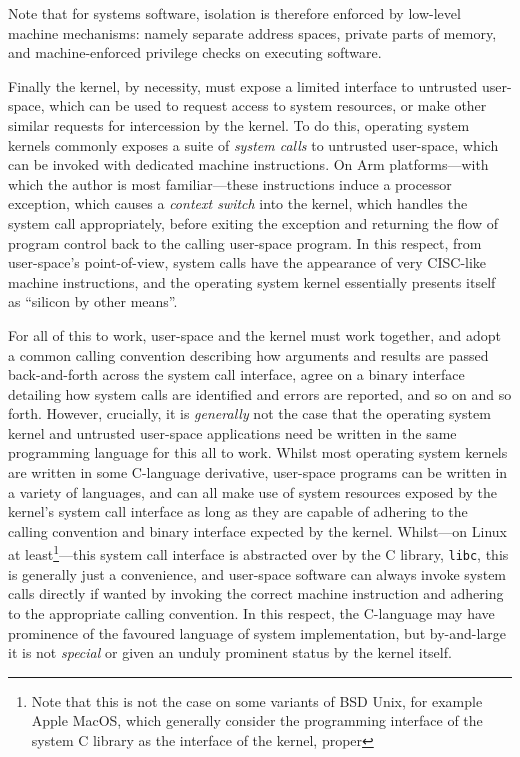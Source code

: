 \documentclass[a4paper, UKenglish, cleveref, autoref, thm-restate]{lipics-v2021}
\begin{document}
Note that for systems software, isolation is therefore enforced by low-level machine mechanisms: namely separate address spaces, private parts of memory, and machine-enforced privilege checks on executing software.

Finally the kernel, by necessity, must expose a limited interface to untrusted user-space, which can be used to request access to system resources, or make other similar requests for intercession by the kernel.
To do this, operating system kernels commonly exposes a suite of \emph{system calls} to untrusted user-space, which can be invoked with dedicated machine instructions.
On Arm platforms---with which the author is most familiar---these instructions induce a processor exception, which causes a \emph{context switch} into the kernel, which handles the system call appropriately, before exiting the exception and returning the flow of program control back to the calling user-space program.
In this respect, from user-space's point-of-view, system calls have the appearance of very CISC-like machine instructions, and the operating system kernel essentially presents itself as ``silicon by other means''.

For all of this to work, user-space and the kernel must work together, and adopt a common calling convention describing how arguments and results are passed back-and-forth across the system call interface, agree on a binary interface detailing how system calls are identified and errors are reported, and so on and so forth.
However, crucially, it is \emph{generally} not the case that the operating system kernel and untrusted user-space applications need be written in the same programming language for this all to work.
Whilst most operating system kernels are written in some C-language derivative, user-space programs can be written in a variety of languages, and can all make use of system resources exposed by the kernel's system call interface as long as they are capable of adhering to the calling convention and binary interface expected by the kernel.
Whilst---on Linux at least\footnote{Note that this is not the case on some variants of BSD Unix, for example Apple MacOS, which generally consider the programming interface of the system C library as the interface of the kernel, proper}---this system call interface is abstracted over by the C library, \texttt{libc}, this is generally just a convenience, and user-space software can always invoke system calls directly if wanted by invoking the correct machine instruction and adhering to the appropriate calling convention.
In this respect, the C-language may have prominence of the favoured language of system implementation, but by-and-large it is not \emph{special} or given an unduly prominent status by the kernel itself.
\end{document}
